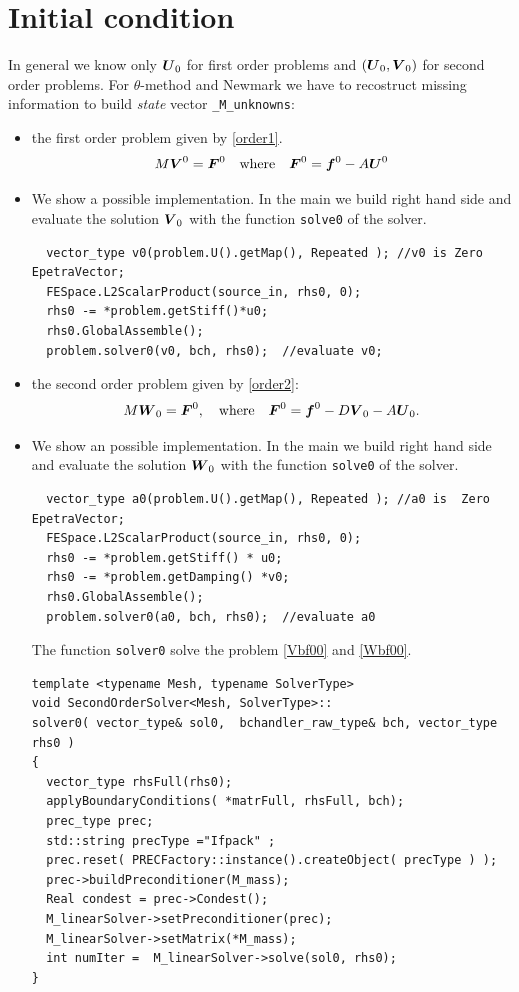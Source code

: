 \documentclass[english,a4paper]{article}
\newcommand{\Ubf}{\text{\mbox{\boldmath $U$}}}
\newcommand{\Abf}{\text{\mbox{\boldmath $W$}}}
\newcommand{\fbf}{\text{\mbox{\boldmath $f$}}}
\newcommand{\Fbf}{\text{\mbox{\boldmath $F$}}}
\newcommand{\Wbf}{\text{\mbox{\boldmath $V$}}}
\begin{document}
\section{Initial condition}\label{start}
In general we know only $\Ubf_0$ for first order problems and
$(\Ubf_0, \Wbf_0)$ for second order problems.
For $\theta$-method and Newmark we have to recostruct missing information
to build {\sl state} vector \verb"_M_unknowns":
\begin{itemize}
\item the first order problem  given by \eqref{order1}.
\begin{equation}\label{Vbf00}
M \Wbf^0= \Fbf^0\quad\text{where}\quad \Fbf^0= \fbf^0 - A \Ubf^0
\end{equation}
\item[]We show a possible implementation. In the main we build right
  hand side and evaluate the solution $\Wbf_0$ with the function
  \verb"solve0" of the solver.
\begin{verbatim}
  vector_type v0(problem.U().getMap(), Repeated ); //v0 is Zero EpetraVector;
  FESpace.L2ScalarProduct(source_in, rhs0, 0);
  rhs0 -= *problem.getStiff()*u0;
  rhs0.GlobalAssemble();
  problem.solver0(v0, bch, rhs0);  //evaluate v0;
\end{verbatim}
 \item the second order problem given by \eqref{order2}:
\begin{equation}\label{Wbf00}
M\Abf_0= \Fbf^0, \quad\text{where}\quad \Fbf^0= \fbf^0- D\Wbf_0-A \Ubf_0.
\end{equation}
\item[]We show an possible implementation. In the main we build right
  hand side and evaluate the solution $\Abf_0$ with the function
  \verb"solve0" of the solver.
\begin{verbatim}
  vector_type a0(problem.U().getMap(), Repeated ); //a0 is  Zero EpetraVector;
  FESpace.L2ScalarProduct(source_in, rhs0, 0);
  rhs0 -= *problem.getStiff() * u0;
  rhs0 -= *problem.getDamping() *v0;
  rhs0.GlobalAssemble();
  problem.solver0(a0, bch, rhs0);  //evaluate a0
\end{verbatim}
The function \verb"solver0" solve the problem \eqref{Vbf00} and
\eqref{Wbf00}.
\begin{verbatim}
template <typename Mesh, typename SolverType>
void SecondOrderSolver<Mesh, SolverType>::
solver0( vector_type& sol0,  bchandler_raw_type& bch, vector_type  rhs0 )
{
  vector_type rhsFull(rhs0);
  applyBoundaryConditions( *matrFull, rhsFull, bch);
  prec_type prec;
  std::string precType ="Ifpack" ;
  prec.reset( PRECFactory::instance().createObject( precType ) );
  prec->buildPreconditioner(M_mass);
  Real condest = prec->Condest();
  M_linearSolver->setPreconditioner(prec);
  M_linearSolver->setMatrix(*M_mass);
  int numIter =  M_linearSolver->solve(sol0, rhs0);
}
\end{verbatim}
\end{itemize}
\end{document}
